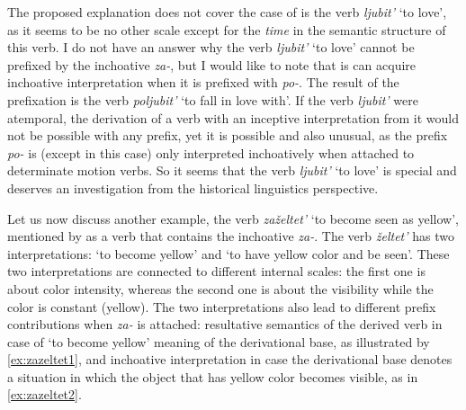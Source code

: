 The proposed explanation does not cover the case of is the verb \textit{ljubit'} `to love', as it seems to be no other scale except for the \textit{time} in the semantic structure of this verb. I do not have an answer why the verb \textit{ljubit'} `to love' cannot be prefixed by the inchoative \textit{za-}, but I would like to note that is can acquire inchoative interpretation when it is prefixed with \textit{po-}. The result of the prefixation is the verb \textit{poljubit'} `to fall in love with'. If the verb \textit{ljubit'} were atemporal, the derivation of a verb with an inceptive interpretation from it would not be possible with any prefix, yet it is possible and also unusual, as the prefix \textit{po-} is (except in this case) only interpreted inchoatively when attached to determinate motion verbs. So it seems that the verb \textit{ljubit'} `to love' is special and deserves an investigation from the historical linguistics perspective. 

Let us now discuss another example, the verb \textit{za\v{z}eltet'} `to become seen as yellow', mentioned by \citet{Braginsky:08} as a verb that contains the inchoative \textit{za-}. The verb \textit{\v{z}eltet'} has two interpretations: `to become yellow' and `to have yellow color and be seen'. These two interpretations are connected to different internal scales: the first one is about color intensity, whereas the second one is about the visibility while the color is constant (yellow). The two interpretations also lead to different prefix contributions when \textit{za-} is attached: resultative semantics of the derived verb in case of `to become yellow' meaning of the derivational base, as illustrated by \ref{ex:zazeltet1}, and inchoative interpretation in case the derivational base denotes a  situation in which the object that has yellow color becomes visible, as in \ref{ex:zazeltet2}.



